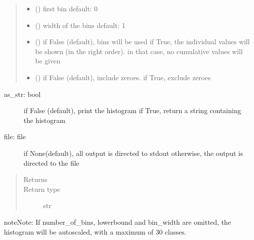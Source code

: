 \documentclass[letterpaper,10pt,english]{sphinxmanual}
\begin{document}
\begin{fulllineitems}
\begin{fulllineitems}
\begin{quote}
\begin{description}
\begin{itemize}
\item {} 
 () \textendash{} first bin 
default: 0

\item {} 
 () \textendash{} width of the bins 
default: 1

\item {} 
 () \textendash{} if False (default), bins will be used 
if True, the individual values will be shown (in the right order).
in that case, no cumulative values will be given 

\item {} 
 () \textendash{} if False (default), include zeroes. if True, exclude zeroes

\end{itemize}

\end{description}\end{quote}
\begin{description}
\item[{as\_str: bool}] \leavevmode
if False (default), print the histogram
if True, return a string containing the histogram

\item[{file: file}] \leavevmode
if None(default), all output is directed to stdout 
otherwise, the output is directed to the file

\end{description}
\begin{quote}\begin{description}
\item[{Returns}] \leavevmode
{}

\item[{Return type}] \leavevmode
str

\end{description}\end{quote}

\begin{sphinxadmonition}{note}{Note:}
If number\_of\_bins, lowerbound and bin\_width are omitted, the histogram will be autoscaled,
with a maximum of 30 classes.
\end{sphinxadmonition}

\end{fulllineitems}


\end{fulllineitems}
\end{document}
